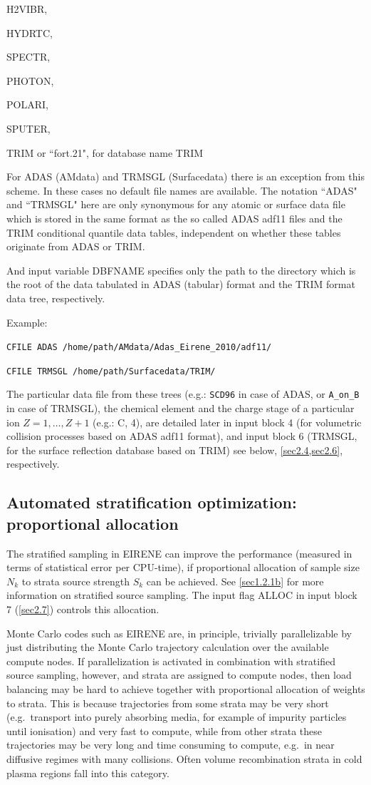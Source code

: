 H2VIBR,

HYDRTC,

SPECTR,

PHOTON,

POLARI,

SPUTER,

TRIM or ``fort.21",  for database name TRIM

For ADAS (AMdata) and TRMSGL (Surfacedata) there is an exception from this
scheme.
In these cases no default file names are available.
The notation ``ADAS" and ``TRMSGL" here are only synonymous for any atomic or
surface data file which is stored in the same format as the so called \ac{ADAS}
adf11 files and the TRIM conditional quantile data tables, independent on
whether these tables originate from \ac{ADAS} or TRIM.

And input variable DBFNAME specifies only the path to the directory which is
the root of the data tabulated in \ac{ADAS} (tabular) format and the TRIM
format data tree, respectively.

Example:

\lstinline|CFILE ADAS /home/path/AMdata/Adas_Eirene_2010/adf11/|

\lstinline|CFILE TRMSGL /home/path/Surfacedata/TRIM/|

The particular data file from these trees (e.g.: \lstinline|SCD96| in case
of \ac{ADAS}, or \lstinline|A_on_B| in case of TRMSGL), the chemical
element  and the charge stage of a particular ion $Z = 1, \dots, Z+1$ (e.g.: C,
4), are detailed later in input block 4 (for volumetric collision processes
based on \ac{ADAS} adf11 format), and input block 6 (TRMSGL, for the surface
reflection database based on TRIM) see below, \cref{sec2.4,sec2.6},
respectively.

\subsection{Automated stratification optimization: proportional allocation}\label{NFILEK}

The stratified sampling in EIRENE can improve the performance (measured in
terms of statistical error per CPU-time), if proportional allocation of sample
size $N_k$ to strata source strength $S_k$ can be achieved.
See \cref{sec1.2.1b} for more information on stratified source sampling.
The input flag ALLOC in input block 7 (\cref{sec2.7}) controls this allocation.

Monte Carlo codes such as EIRENE are, in principle,  trivially parallelizable
by just distributing the Monte Carlo trajectory calculation over the available
compute nodes.
If parallelization is activated in combination with stratified source sampling,
however, and strata are assigned to compute nodes, then load balancing may be
hard to achieve together with proportional allocation of weights to strata.
This is because trajectories from some strata may be very short (e.g.\
transport into purely absorbing media, for example of impurity particles until
ionisation) and very fast to compute, while from other strata these
trajectories may be very long and time consuming to compute, e.g.\ in near
diffusive regimes with many collisions.
Often volume recombination strata in cold plasma regions fall into this
category.

